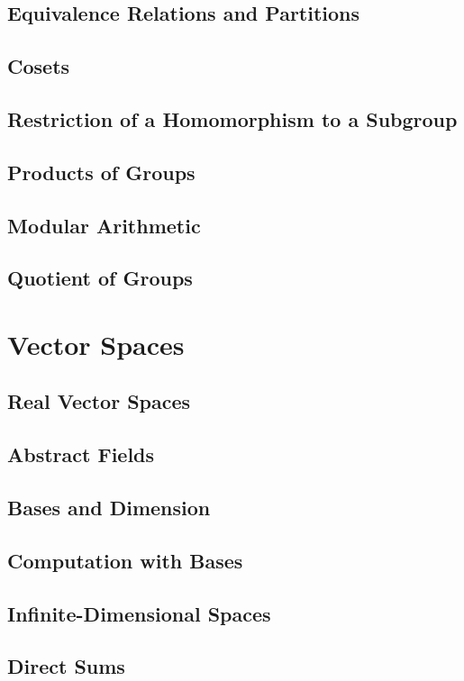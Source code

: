 \documentclass[12pt]{book}
\begin{document}
\section{Equivalence Relations and Partitions}
\section{Cosets}
\section{Restriction of a Homomorphism to a Subgroup}
\section{Products of Groups}
\section{Modular Arithmetic}
\section{Quotient of Groups}




\chapter{Vector Spaces}

\section{Real Vector Spaces}
\section{Abstract Fields}
\section{Bases and Dimension}
\section{Computation with Bases}
\section{Infinite-Dimensional Spaces}
\section{Direct Sums}
\end{document}
